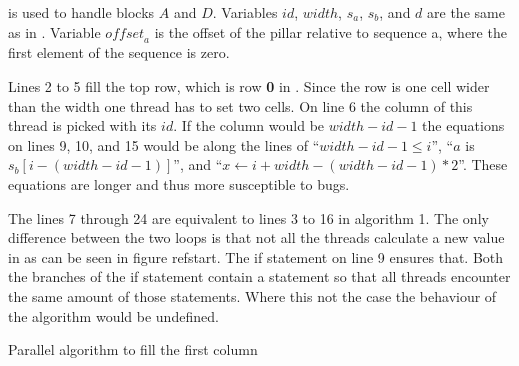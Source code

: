  is used to handle blocks $A$ and $D$.
Variables $id$, $width$, $s_a$, $s_b$, and $d$ are the same as in .
Variable $\mathit{offset}_a$ is the offset of the pillar relative to sequence a, where the first element of the sequence is zero.

Lines 2 to 5 fill the top row, which is row \textbf{0} in .
Since the row is one cell wider than the width one thread has to set two cells.
On line 6 the column of this thread is picked with its $id$.
If the column would be $width - id - 1$ the equations on lines 9, 10, and 15 would be along the lines of ``$width - id - 1 \leq i$'', ``$a$ is $s_b[i-(width-id-1)]$'', and ``$x \gets i + width - (width - id - 1) * 2$''.
These equations are longer and thus more susceptible to bugs.

The lines 7 through 24 are equivalent to lines 3 to 16 in algorithm 1.
The only difference between the two loops is that not all the threads calculate a new value in  as can be seen in figure ref{start}.
The if statement on line 9 ensures that.
Both the branches of the if statement contain a  statement so that all threads encounter the same amount of those statements.
Where this not the case the behaviour of the algorithm would be undefined.

\begin{algorithm}[htb]
\caption{Parallel algorithm to fill the first column} \label{fill_column}
\begin{algorithmic}[1]
    \Statex
    \Statex
    \EndWhile
\EndProcedure
\end{algorithmic}
\end{algorithm}

